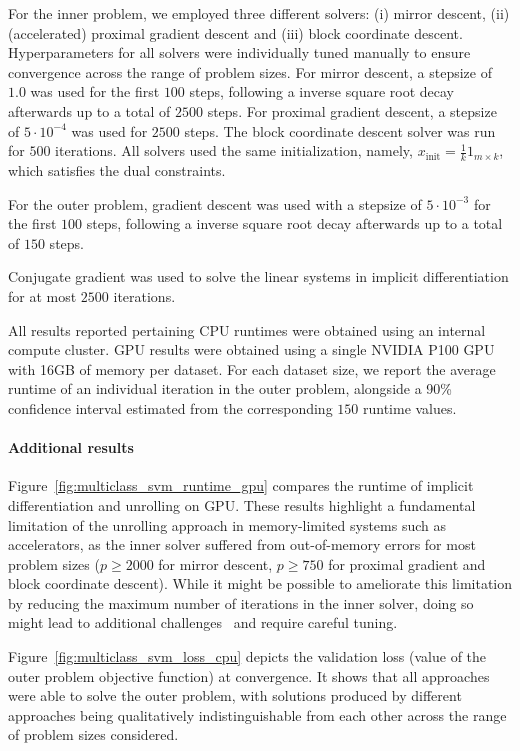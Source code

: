 \documentclass{article}
\begin{document}
For the inner problem, we employed three different solvers: (i) mirror descent, (ii) (accelerated) proximal gradient descent and (iii) block coordinate descent. Hyperparameters for all solvers were individually tuned manually to ensure convergence across the range of problem sizes. For mirror descent, a stepsize of $1.0$ was used for the first $100$ steps, following a inverse square root decay afterwards up to a total of $2500$ steps. For proximal gradient descent, a stepsize of $5 \cdot 10^{-4}$ was used for $2500$ steps. The block coordinate descent solver was run for $500$ iterations. All solvers used the same initialization, namely, $x_{\mathrm{init}}=\frac{1}{k}1_{m \times k}$, which satisfies the dual constraints.

For the outer problem, gradient descent was used with a stepsize of $5 \cdot 10^{-3}$ for the first $100$ steps, following a inverse square root decay afterwards up to a total of $150$ steps.

Conjugate gradient was used to solve the linear systems in implicit differentiation for at most $2500$ iterations.

All results reported pertaining CPU runtimes were obtained using an internal compute cluster. GPU results were obtained using a single NVIDIA P100 GPU with 16GB of memory per dataset. For each dataset size, we report the average runtime of an individual iteration in the outer problem, alongside a 90\% confidence interval estimated from the corresponding $150$ runtime values.

\paragraph{Additional results}

Figure~\ref{fig:multiclass_svm_runtime_gpu} compares the runtime of implicit
differentiation and unrolling on GPU. These results highlight a fundamental
limitation of the unrolling approach in memory-limited systems such as
accelerators, as the inner solver suffered from out-of-memory errors for most
problem sizes ($p \ge 2000$ for mirror descent, $p \ge 750$ for proximal
gradient and block coordinate descent). While it might be possible to ameliorate
this limitation by reducing the maximum number of iterations in the inner
solver, doing so might lead to additional challenges~\cite{wu2018understanding} and require careful tuning.

Figure~\ref{fig:multiclass_svm_loss_cpu} depicts the validation loss (value of the outer problem objective function) at convergence. It shows that all approaches were able to solve the outer problem, with solutions produced by different approaches being qualitatively indistinguishable from each other across the range of problem sizes considered.
\end{document}
